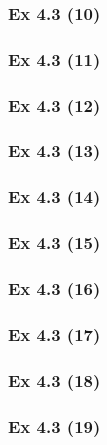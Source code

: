 \subsubsection{Ex 4.3 (10)}\label{sec:Ex_4.3.10}

\newpage		%

\subsubsection{Ex 4.3 (11)}\label{sec:Ex_4.3.11}

\subsubsection{Ex 4.3 (12)}\label{sec:Ex_4.3.12}

\subsubsection{Ex 4.3 (13)}\label{sec:Ex_4.3.13}

\subsubsection{Ex 4.3 (14)}\label{sec:Ex_4.3.14}

\subsubsection{Ex 4.3 (15)}\label{sec:Ex_4.3.15}

\subsubsection{Ex 4.3 (16)}\label{sec:Ex_4.3.16}

\subsubsection{Ex 4.3 (17)}\label{sec:Ex_4.3.17}

\subsubsection{Ex 4.3 (18)}\label{sec:Ex_4.3.18}

\subsubsection{Ex 4.3 (19)}\label{sec:Ex_4.3.19}

